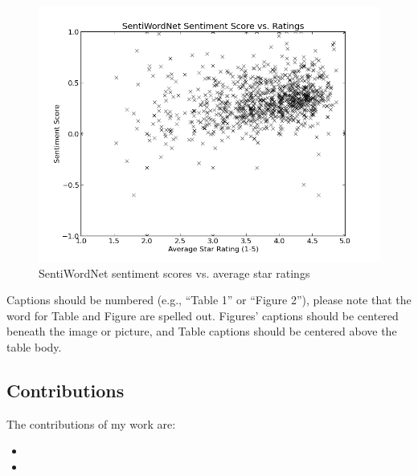 \documentclass{acm_proc_article-sp}
\begin{document}
\begin{figure}
\centering
\includegraphics[scale=0.4]{swn.png}
\caption{SentiWordNet sentiment scores vs. average star ratings}
\label{fig:myfig2}
\end{figure}
Captions should be numbered (e.g., ``Table 1'' or ``Figure 2''), please note that the word for Table and Figure are spelled out. Figures' captions should be centered beneath the image or picture, and Table captions should be centered above the table body.



\subsection{Contributions}

The contributions of my work are:

\begin{itemize}
\item{}
\item{}
\end{itemize}



\balancecolumns
\end{document}
